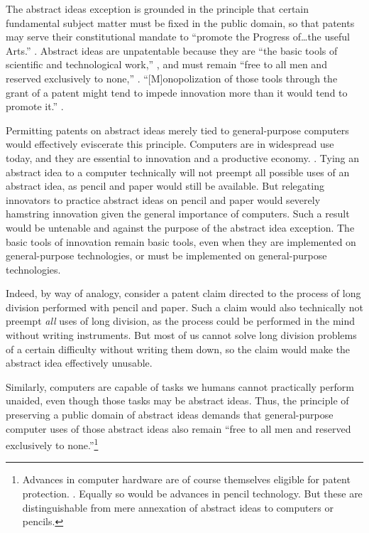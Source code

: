 \documentclass{scotus}
\begin{document}
The abstract ideas exception is grounded in the principle that certain
fundamental subject matter must be fixed in the public domain, so that
patents may serve their constitutional mandate to ``promote the Progress
of\ldots the useful Arts.'' .
Abstract ideas are unpatentable because they
are ``the basic tools of scientific and technological work,'' , and must remain ``free to all men and reserved exclusively to none,''
. ``[M]onopolization
of those tools through the grant of a patent might tend to impede innovation
more than it would tend to promote it.'' .

Permitting patents on abstract ideas merely tied to general-purpose computers
would effectively eviscerate this principle.
Computers are in
widespread use today, and they are essential to innovation and a productive
economy. . 
Tying an abstract idea to a computer technically will not preempt
all possible uses of an abstract idea, as pencil and paper would still be
available. But relegating innovators to practice abstract ideas on pencil and
paper would severely hamstring innovation given the general importance of
computers. Such a result would be untenable and
against the purpose of the abstract idea exception.
The basic tools of innovation remain basic tools, even when they are implemented
on general-purpose technologies, or must be implemented on general-purpose
technologies.

Indeed, by way of analogy, consider a patent claim directed to the process of
long division performed with pencil and paper. Such a claim would also
technically not preempt \emph{all} uses of long division, as the process could
be performed in the mind without writing instruments.
But most of us cannot solve long division problems of a
certain difficulty without writing them down, so the claim would make
the abstract idea
effectively unusable.

Similarly, computers are capable of tasks we
humans cannot practically perform unaided, even though those tasks may be
abstract ideas. Thus, the principle of preserving a public domain of abstract
ideas demands that general-purpose computer uses of those abstract ideas also
remain ``free to all men and reserved exclusively to none.''\footnote{%
Advances in computer hardware are of course themselves eligible for patent
protection.  . Equally so would be advances in pencil technology. But these are
distinguishable from mere annexation of abstract ideas to computers or pencils.}
\end{document}
